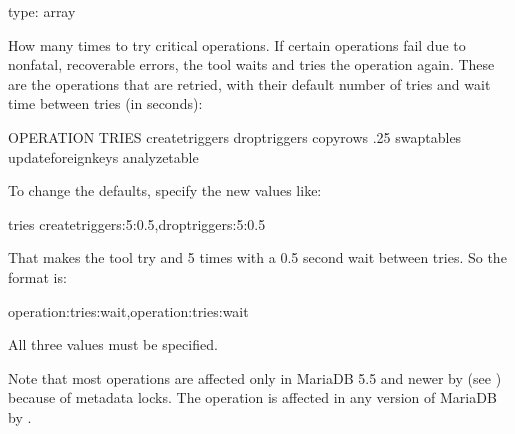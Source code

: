 \documentclass[letterpaper,10pt,english]{sphinxmanual}
\begin{document}
\begin{fulllineitems}
\label{\detokenize{mariadb-schema-change:cmdoption-mariadb-schema-change-tries}}
type: array

How many times to try critical operations.  If certain operations fail due
to non\sphinxhyphen{}fatal, recoverable errors, the tool waits and tries the operation
again.  These are the operations that are retried, with their default number
of tries and wait time between tries (in seconds):

\begin{sphinxVerbatim}[commandchars=\\\{\}]
OPERATION            TRIES   
     
create\PYGZus{}triggers               
drop\PYGZus{}triggers                 
copy\PYGZus{}rows                  .25
swap\PYGZus{}tables                   
update\PYGZus{}foreign\PYGZus{}keys           
analyze\PYGZus{}table                 
\end{sphinxVerbatim}

To change the defaults, specify the new values like:

\begin{sphinxVerbatim}[commandchars=\\\{\}]
\PYGZhy{}\PYGZhy{}tries create\PYGZus{}triggers:5:0.5,drop\PYGZus{}triggers:5:0.5
\end{sphinxVerbatim}

That makes the tool try  and  5 times
with a 0.5 second wait between tries.  So the format is:

\begin{sphinxVerbatim}[commandchars=\\\{\}]
operation:tries:wait\PYG{o}{[},operation:tries:wait\PYG{o}{]}
\end{sphinxVerbatim}

All three values must be specified.

Note that most operations are affected only in MariaDB 5.5 and newer by
 (see {\hyperref[\detokenize{mariadb-schema-change:cmdoption-mariadb-schema-change-set-vars}]{}}) because of metadata locks.
The  operation is affected in any version of MariaDB by
.


\end{fulllineitems}
\end{document}
